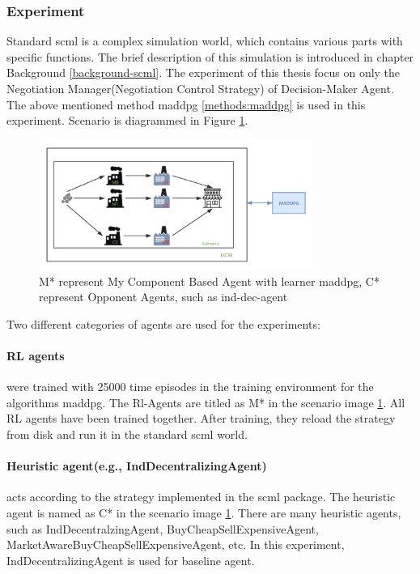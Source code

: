 \subsubsection{Experiment}
Standard \gls{scml} is a complex simulation world, which contains various parts with specific functions. The brief description of this simulation is introduced in chapter Background \ref{background-scml}. The experiment of this thesis focus on only the Negotiation Manager(Negotiation Control Strategy) of Decision-Maker Agent. The above mentioned method maddpg \ref{methods:maddpg} is used in this experiment. 
Scenario is diagrammed in Figure \ref{fig:scenario-standard-scml}.

\begin{figure}[htbp]
\centering
\includegraphics[width=0.80\textwidth]{./images/scenario-standard-scml.png}
\caption{M* represent My Component Based Agent with learner \gls{maddpg}, C* represent Opponent Agents, such as \gls{ind-dec-agent}}
\label{fig:scenario-standard-scml}
\end{figure}

Two different categories of agents are used for the experiments:
\paragraph{RL agents} were trained with 25000 time episodes in the training environment for the algorithms maddpg. The Rl-Agents are titled as M* in the scenario image \ref{fig:scenario-standard-scml}. All RL agents have been trained together. After training, they reload the strategy from disk and run it in the standard scml world.

\paragraph{Heuristic agent(e.g., IndDecentralizingAgent)} acts according to the strategy implemented in the scml package. The heuristic agent is named as C* in the scenario image \ref{fig:scenario-standard-scml}. There are many heuristic agents, such as IndDecentralzingAgent, BuyCheapSellExpensiveAgent, MarketAwareBuyCheapSellExpensiveAgent, etc. In this experiment, IndDecentralizingAgent is used for baseline agent.

